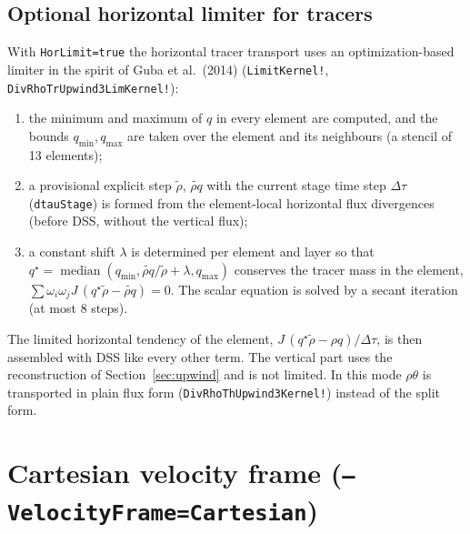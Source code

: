 \documentclass[11pt,a4paper]{article}
\newcommand{\code}[1]{\texttt{#1}}
\begin{document}
\subsection{Optional horizontal limiter for tracers}

With \code{HorLimit=true} the horizontal tracer transport uses an
optimization-based limiter in the spirit of Guba et al.\ (2014)
(\code{LimitKernel!}, \code{DivRhoTrUpwind3LimKernel!}):
\begin{enumerate}
\item the minimum and maximum of $q$ in every element are computed, and the
  bounds $q_{\min}, q_{\max}$ are taken over the element and its neighbours
  (a stencil of 13 elements);
\item a provisional explicit step $\tilde\rho$, $\widetilde{\rho q}$ with the
  current stage time step $\Delta\tau$ (\code{dtauStage}) is formed from the
  element-local horizontal flux divergences (before DSS, without the
  vertical flux);
\item a constant shift $\lambda$ is determined per element and layer so that
  $q^\star = \operatorname{median}(q_{\min}, \widetilde{\rho q}/\tilde\rho + \lambda, q_{\max})$
  conserves the tracer mass in the element,
  $\sum \omega_i\omega_j J\,(q^\star\tilde\rho - \widetilde{\rho q}) = 0$.
  The scalar equation is solved by a secant iteration (at most 8 steps).
\end{enumerate}
The limited horizontal tendency of the element,
$J\,(q^\star\tilde\rho - \rho q)/\Delta\tau$, is then assembled with DSS like
every other term. The vertical part uses the reconstruction of
Section~\ref{sec:upwind} and is not limited. In this mode $\rho\theta$ is
transported in plain flux form (\code{DivRhoThUpwind3Kernel!}) instead of
the split form.

\section{Cartesian velocity frame (\code{--VelocityFrame=Cartesian})}
\label{sec:cartframe}
\end{document}
